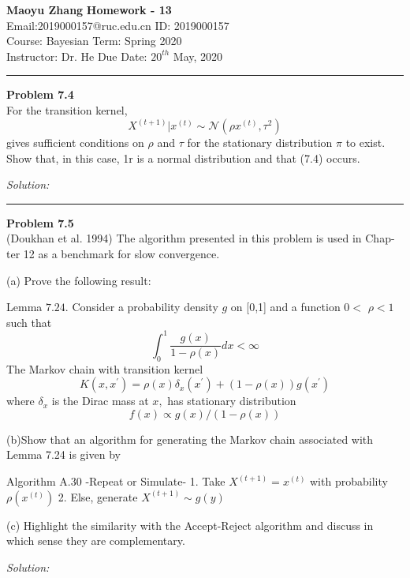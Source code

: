 \documentclass[a4paper, 11pt]{article}
\newenvironment{problem}[2][Problem]
    { \begin{mdframed}[backgroundcolor=gray!20] \textbf{#1 #2} \\}
    {  \end{mdframed}}
\newenvironment{solution}
    {\textit{Solution:}}
    {}
\begin{document}
\noindent
\large\textbf{Maoyu Zhang} \hfill \textbf{Homework - 13}   \\
Email:2019000157@ruc.edu.cn  \hfill ID: 2019000157 \\
\normalsize Course: Bayesian \hfill Term: Spring 2020\\
Instructor: Dr. He \hfill Due Date: $20^{th}$ May, 2020 \\
\noindent\rule{7in}{2.8pt}

\begin{problem}{7.4}
For the transition kernel,
$$
X^{(t+1)} | x^{(t)} \sim \mathcal{N}\left(\rho x^{(t)}, \tau^{2}\right)
$$
gives sufficient conditions on $\rho$ and $\tau$ for the stationary distribution $\pi$ to exist.
Show that, in this case, 1r is a normal distribution and that (7.4) occurs.
\end{problem}
\begin{solution}

\end{solution}

\noindent\rule{7in}{2.8pt}
\begin{problem}{7.5}
(Doukhan et al. 1994) The algorithm presented in this problem is used in Chap-
ter 12 as a benchmark for slow convergence.

(a) Prove the following result:

Lemma $7.24 .$ Consider a probability density $g$ on [0,1] and a function $0<$ $\rho<1$ such that
\[
\int_{0}^{1} \frac{g(x)}{1-\rho(x)} d x<\infty
\]
The Markov chain with transition kernel
\[
K\left(x, x^{\prime}\right)=\rho(x) \delta_{x}\left(x^{\prime}\right)+(1-\rho(x)) g\left(x^{\prime}\right)
\]
where $\delta_{x}$ is the Dirac mass at $x,$ has stationary distribution
\[
f(x) \propto g(x) /(1-\rho(x))
\]

(b)Show that an algorithm for generating the Markov chain associated with
Lemma 7.24 is given by

Algorithm A.30 -Repeat or Simulate-
1. Take $X^{(t+1)}=x^{(t)}$ with probability $\rho\left(x^{(t)}\right)$
2. Else, generate $X^{(t+1)} \sim g(y)$

(c) Highlight the similarity with the Accept-Reject algorithm and discuss in which sense they are complementary.



\end{problem}
\begin{solution}

\end{solution}
\end{document}
